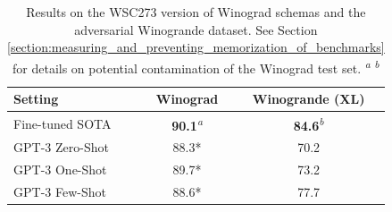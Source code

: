 \begin{table}
    \centering
    \begin{center}
        \begin{tabular}{l c c}
        \toprule
        Setting & Winograd & Winogrande (XL) \\ 
        \midrule
        Fine-tuned SOTA  & \textbf{90.1}\textsuperscript{\textit{a}}  & \textbf{84.6}\textsuperscript{\textit{b}} \\ 
        GPT-3 Zero-Shot  & 88.3* & 70.2 \\
        GPT-3 One-Shot & 89.7* & 73.2 \\
        GPT-3 Few-Shot  & 88.6* & 77.7 \\
        \bottomrule
        \end{tabular}
    \end{center}
    \caption{Results on the WSC273 version of Winograd schemas and the adversarial Winogrande dataset. See Section \ref{section:measuring_and_preventing_memorization_of_benchmarks} for details on potential contamination of the Winograd test set. \textsuperscript{\textit{a}}\cite{sakaguchi2019winogrande}
    \textsuperscript{\textit{b}}\cite{lin2020tttttackling}
    }
    \label{table:winograd}
\end{table}
